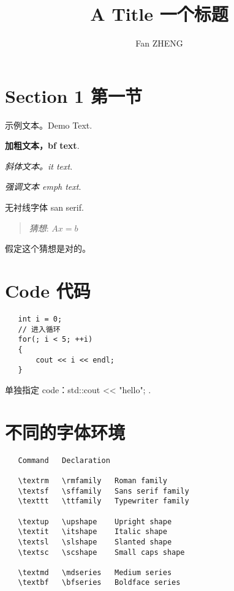 \documentclass[]{article}
\begin{document}
\title{A Title 一个标题}
\author{Fan ZHENG}
\maketitle

\section{Section 1 第一节}

示例文本。Demo Text.

\textbf{加粗文本，bf text}. 

\textit{斜体文本。it text}. 

\emph{强调文本 emph text}. 

\textsf{无衬线字体 san serif}.

\begin{quotation}
    \emph{猜想}: $Ax = b$
\end{quotation}

假定这个猜想是对的。

\section{Code 代码}
\begin{verbatim}
   int i = 0;
   // 进入循环
   for(; i < 5; ++i)
   {
       cout << i << endl;
   }
\end{verbatim}

单独指定 code：{\code std::cout << "hello"; }.

\section{不同的字体环境}

\begin{verbatim}
   Command   Declaration
    
   \textrm   \rmfamily   Roman family
   \textsf   \sffamily   Sans serif family
   \texttt   \ttfamily   Typewriter family
    
   \textup   \upshape    Upright shape
   \textit   \itshape    Italic shape
   \textsl   \slshape    Slanted shape
   \textsc   \scshape    Small caps shape
    
   \textmd   \mdseries   Medium series
   \textbf   \bfseries   Boldface series
\end{verbatim}
\end{document}
